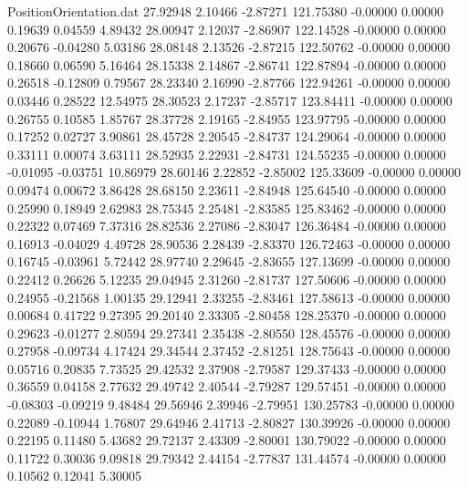 \begin{filecontents}{PositionOrientation.dat}
  27.92948    2.10466   -2.87271   121.75380   -0.00000    0.00000    0.19639    0.04559    4.89432
  28.00947    2.12037   -2.86907   122.14528   -0.00000    0.00000    0.20676   -0.04280    5.03186
  28.08148    2.13526   -2.87215   122.50762   -0.00000    0.00000    0.18660    0.06590    5.16464
  28.15338    2.14867   -2.86741   122.87894   -0.00000    0.00000    0.26518   -0.12809    0.79567
  28.23340    2.16990   -2.87766   122.94261   -0.00000    0.00000    0.03446    0.28522   12.54975
  28.30523    2.17237   -2.85717   123.84411   -0.00000    0.00000    0.26755    0.10585    1.85767
  28.37728    2.19165   -2.84955   123.97795   -0.00000    0.00000    0.17252    0.02727    3.90861
  28.45728    2.20545   -2.84737   124.29064   -0.00000    0.00000    0.33111    0.00074    3.63111
  28.52935    2.22931   -2.84731   124.55235   -0.00000    0.00000   -0.01095   -0.03751   10.86979
  28.60146    2.22852   -2.85002   125.33609   -0.00000    0.00000    0.09474    0.00672    3.86428
  28.68150    2.23611   -2.84948   125.64540   -0.00000    0.00000    0.25990    0.18949    2.62983
  28.75345    2.25481   -2.83585   125.83462   -0.00000    0.00000    0.22322    0.07469    7.37316
  28.82536    2.27086   -2.83047   126.36484   -0.00000    0.00000    0.16913   -0.04029    4.49728
  28.90536    2.28439   -2.83370   126.72463   -0.00000    0.00000    0.16745   -0.03961    5.72442
  28.97740    2.29645   -2.83655   127.13699   -0.00000    0.00000    0.22412    0.26626    5.12235
  29.04945    2.31260   -2.81737   127.50606   -0.00000    0.00000    0.24955   -0.21568    1.00135
  29.12941    2.33255   -2.83461   127.58613   -0.00000    0.00000    0.00684    0.41722    9.27395
  29.20140    2.33305   -2.80458   128.25370   -0.00000    0.00000    0.29623   -0.01277    2.80594
  29.27341    2.35438   -2.80550   128.45576   -0.00000    0.00000    0.27958   -0.09734    4.17424
  29.34544    2.37452   -2.81251   128.75643   -0.00000    0.00000    0.05716    0.20835    7.73525
  29.42532    2.37908   -2.79587   129.37433   -0.00000    0.00000    0.36559    0.04158    2.77632
  29.49742    2.40544   -2.79287   129.57451   -0.00000    0.00000   -0.08303   -0.09219    9.48484
  29.56946    2.39946   -2.79951   130.25783   -0.00000    0.00000    0.22089   -0.10944    1.76807
  29.64946    2.41713   -2.80827   130.39926   -0.00000    0.00000    0.22195    0.11480    5.43682
  29.72137    2.43309   -2.80001   130.79022   -0.00000    0.00000    0.11722    0.30036    9.09818
  29.79342    2.44154   -2.77837   131.44574   -0.00000    0.00000    0.10562    0.12041    5.30005

\end{filecontents}
